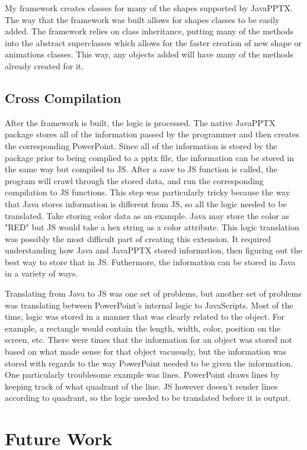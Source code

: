 \documentclass[12pt,twoside]{reedthesis}
\begin{document}
My framework creates classes for many of the shapes supported by JavaPPTX. The way that the framework was built allows for shapes classes to be easily added. The framework relies on class inheritance, putting many of the methods into the abstract superclasses which allows for the faster creation of new shape or animations classes. This way, any objects added will have many of the methods already created for it. 

\subsection{Cross Compilation}
After the framework is built, the logic is processed. The native JavaPPTX package stores all of the information passed by the programmer and then creates the corresponding PowerPoint. Since all of the information is stored by the package prior to being complied to a pptx file, the information can be stored in the same way but compiled to JS. After a save to JS function is called, the program will crawl through the stored data, and run the corresponding compilation to JS functions. This step was particularly tricky because the way that Java stores information is different from JS, so all the logic needed to be translated. Take storing color data as an example. Java may store the color as "RED" but JS would take a hex string as a color attribute. This logic translation was possibly the most difficult part of creating this extension. It required understanding how Java and  JavaPPTX stored information, then figuring out the best way to store that in JS. Futhermore, the information can be stored in Java in a variety of ways. 

Translating from Java to JS was one set of problems, but another set of problems was translating between PowerPoint's internal logic to JavaScripts. Most of the time, logic was stored in a manner that was clearly related to the object. For example, a rectangle would contain the length, width, color, position on the screen, etc. There were times that the information for an object was stored not based on what made sense for that object vacuously, but the information was stored with regards to the way PowerPoint needed to be given the information. One particularly troublesome example was lines. PowerPoint draws lines by keeping track of what quadrant of the line. JS however doesn't render lines according to quadrant, so the logic needed to be translated before it is output. 

\section{Future Work}
\end{document}
